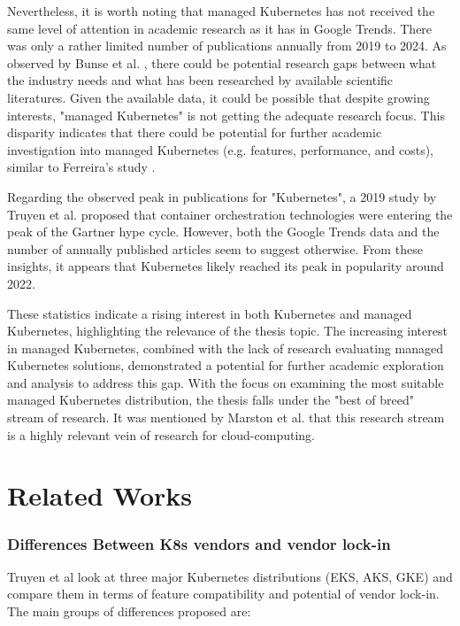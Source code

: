 Nevertheless, it is worth noting that managed Kubernetes has not received the same level of attention in academic research as it has in Google Trends. There was only a rather limited number of publications annually from 2019 to 2024. As observed by Bunse et al. \cite{BUNSE2011667}, there could be potential research gaps between what the industry needs and what has been researched by available scientific literatures. Given the available data, it could be possible that despite growing interests, "managed Kubernetes" is not getting the adequate research focus. This disparity indicates that there could be potential for further academic investigation into managed Kubernetes (e.g. features, performance, and costs), similar to Ferreira’s study \cite{pereiraferreiraPerformanceEvaluationContainers2019}.

Regarding the observed peak in publications for "Kubernetes", a 2019 study by Truyen et al. \cite{truyenComprehensiveFeatureComparison2019} proposed that container orchestration technologies were entering the peak of the Gartner hype cycle. However, both the Google Trends data and the number of annually published articles seem to suggest otherwise. From these insights, it appears that Kubernetes likely reached its peak in popularity around 2022.

These statistics indicate a rising interest in both Kubernetes and managed Kubernetes, highlighting the relevance of the thesis topic. The increasing interest in managed Kubernetes, combined with the lack of research evaluating managed Kubernetes solutions, demonstrated a potential for further academic exploration and analysis to address this gap. With the focus on examining the most suitable managed Kubernetes distribution, the thesis falls under the "best of breed" stream of research. It was mentioned by Marston et al. \cite{MARSTON2011176} that this research stream is a highly relevant vein of research for cloud-computing.

\section{Related Works}
\subsubsection{Differences Between K8s vendors and vendor lock-in}
Truyen et al \cite{truyenManagingFeatureCompatibility2020} look at three major Kubernetes distributions (EKS, AKS, GKE) and compare them in terms of feature compatibility and potential of vendor lock-in. The main groups of differences proposed are:

